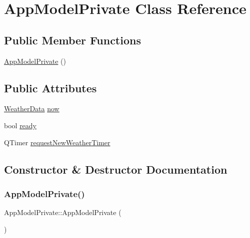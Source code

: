 \hypertarget{class_app_model_private}{}\section{App\+Model\+Private Class Reference}
\label{class_app_model_private}
\subsection*{Public Member Functions}
\begin{DoxyCompactItemize}
\item 
\hyperlink{class_app_model_private_ac7e4e160306c7ff9c771d2dd34c243ac}{App\+Model\+Private} ()
\end{DoxyCompactItemize}
\subsection*{Public Attributes}
\begin{DoxyCompactItemize}
\item 
\hyperlink{class_weather_data}{Weather\+Data} \hyperlink{class_app_model_private_adacce6c96a2a7b0b825586a63a15bcac}{now}
\item 
bool \hyperlink{class_app_model_private_ab0434f387adadf9ed65183496fe80f77}{ready}
\item 
Q\+Timer \hyperlink{class_app_model_private_ad073c8bcf6739fd658009860e12aa72c}{request\+New\+Weather\+Timer}
\end{DoxyCompactItemize}


\subsection{Constructor \& Destructor Documentation}
\mbox{\label{class_app_model_private_ac7e4e160306c7ff9c771d2dd34c243ac}} 
\subsubsection{\texorpdfstring{App\+Model\+Private()}{AppModelPrivate()}}
{\footnotesize\ttfamily App\+Model\+Private\+::\+App\+Model\+Private (\begin{DoxyParamCaption}{ }\end{DoxyParamCaption})\hspace{0.3cm}{\ttfamily [inline]}}



